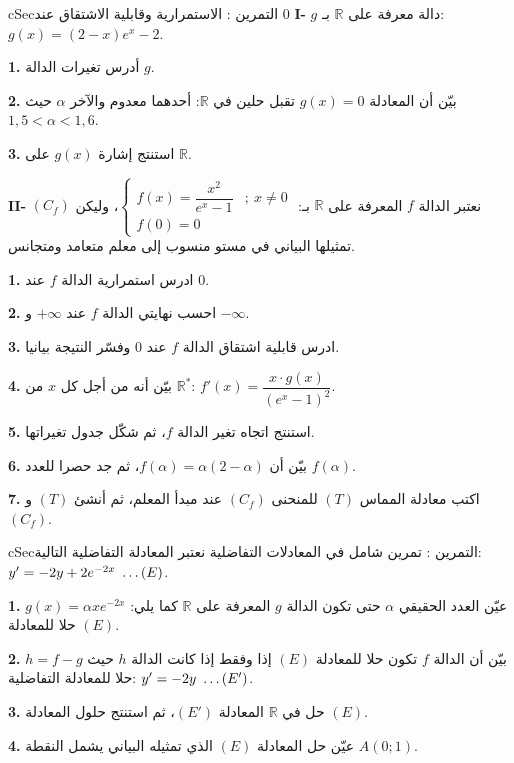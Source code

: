 \documentclass[12pt,a4paper]{article}
\newenvironment{BOX}[2]{\begin{otherlanguage}{english}\begin{arbox}{#1}{#2}}{\end{arbox}\end{otherlanguage}}
\newcounter{exo}
\newenvironment{tamrin}[1]{\stepcounter{exo}\begin{BOX}{cSec}{التمرين \theexo: #1}}{\end{BOX}}
\renewcommand{\ldots}{\mathinner{\ldotp\ldotp\ldotp}}
\newcommand{\R}{\mathbb{R}}
\newcommand{\QQ}[1]{\par\smallskip\textbf{#1.} }
\begin{document}
\begin{tamrin}{الاستمرارية وقابلية الاشتقاق عند $0$}
\textbf{I-} $g$ دالة معرفة على $\R$ بـ: $g(x)=(2-x)e^{x}-2$.
\QQ{1} أدرس تغيرات الدالة $g$.
\QQ{2} بيّن أن المعادلة $g(x)=0$ تقبل حلين في $\R$: أحدهما معدوم والآخر $\alpha$ حيث $1{,}5<\alpha<1{,}6$.
\QQ{3} استنتج إشارة $g(x)$ على $\R$.

\textbf{II-} نعتبر الدالة $f$ المعرفة على $\R$ بـ: $\left\{\begin{array}{ll}f(x)=\dfrac{x^{2}}{e^{x}-1}&;\ x\neq0\\[6pt] f(0)=0&\end{array}\right.$، وليكن $(C_f)$ تمثيلها البياني في مستو منسوب إلى معلم متعامد ومتجانس.
\QQ{1} ادرس استمرارية الدالة $f$ عند $0$.
\QQ{2} احسب نهايتي الدالة $f$ عند $+\infty$ و $-\infty$.
\QQ{3} ادرس قابلية اشتقاق الدالة $f$ عند $0$ وفسّر النتيجة بيانيا.
\QQ{4} بيّن أنه من أجل كل $x$ من $\R^{*}$: $f'(x)=\dfrac{x\cdot g(x)}{\left(e^{x}-1\right)^{2}}$.
\QQ{5} استنتج اتجاه تغير الدالة $f$، ثم شكّل جدول تغيراتها.
\QQ{6} بيّن أن $f(\alpha)=\alpha(2-\alpha)$، ثم جد حصرا للعدد $f(\alpha)$.
\QQ{7} اكتب معادلة المماس $(T)$ للمنحنى $(C_f)$ عند مبدأ المعلم، ثم أنشئ $(T)$ و $(C_f)$.
\end{tamrin}

\begin{tamrin}{تمرين شامل في المعادلات التفاضلية}
نعتبر المعادلة التفاضلية التالية: $y'=-2y+2e^{-2x}\ \ldots(E)$.
\QQ{1} عيّن العدد الحقيقي $\alpha$ حتى تكون الدالة $g$ المعرفة على $\R$ كما يلي: $g(x)=\alpha xe^{-2x}$ حلا للمعادلة $(E)$.
\QQ{2} بيّن أن الدالة $f$ تكون حلا للمعادلة $(E)$ إذا وفقط إذا كانت الدالة $h$ حيث $h=f-g$ حلا للمعادلة التفاضلية: $y'=-2y\ \ldots(E')$.
\QQ{3} حل في $\R$ المعادلة $(E')$، ثم استنتج حلول المعادلة $(E)$.
\QQ{4} عيّن حل المعادلة $(E)$ الذي تمثيله البياني يشمل النقطة $A(0;1)$.
\end{tamrin}
\end{document}
